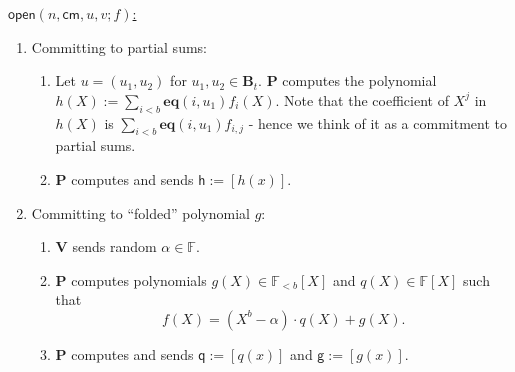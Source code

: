 \documentclass[11pt]{article} %
\newcommand{\F}{\ensuremath{\mathbb F}\xspace}
\newcommand{\cm}{\ensuremath{\mathsf{cm}}\xspace}
\newcommand{\open}{\ensuremath{\mathsf{open}}\xspace}
\newcommand{\defeq}{:=}
\newcommand{\enc}[1]{\ensuremath{\left[#1\right]}\xspace}
\newcommand{\prv}{\ensuremath{\mathsf{\mathbf{P}}}\xspace}
\newcommand{\ver}{\ensuremath{\mathsf{\mathbf{V}}}\xspace}
\newcommand{\polysofdeg}[1]{\ensuremath{\F_{< #1}[X]}\xspace}
\newcommand{\polys}{\ensuremath{\F[X]}\xspace}
\newcommand{\sumi}[1]{\sum_{i< #1}}
\newcommand{\h}{\ensuremath{\mathsf{h}}\xspace}
\renewcommand{\g}{\ensuremath{\mathsf{g}}\xspace}
\newcommand{\q}{\ensuremath{\mathsf{q}}\xspace}
\newcommand{\eq}{\ensuremath{\mathsf{eq}}\xspace}
\renewcommand{\eq}{\ensuremath{\mathbf{eq}}\xspace}
\newcommand{\B}[1]{\ensuremath{\mathbf{B}_{#1}}\xspace}
\begin{document}
\noindent
\underline{$\open(n,\cm,u,v;f)$:} \\ \noindent
\begin{enumerate}
 \item \textsf{Committing to partial sums:} \ 
\begin{enumerate}
\item Let $u=(u_1,u_2)$ for $u_1,u_2 \in \B{t}$. \prv computes the polynomial $h(X)\defeq \sumi{b}\eq(i,u_1) f_i(X)$. Note that the coefficient of $X^j$ in $h(X)$ is $\sumi{b}\eq(i,u_1) f_{i,j}$ - hence we think of it as a commitment to partial sums. 
 \item \prv computes and sends $\h\defeq\enc{h(x)}$.
 
 \end{enumerate}
\item \textsf{ Committing to  ``folded'' polynomial $g$:} 
\begin{enumerate}
 \item \ver sends random $\alpha \in \F$.
\item \prv computes polynomials $g(X) \in \polysofdeg{b}$ and $q(X)\in \polys$ such that
\[f(X)=(X^b-\alpha)\cdot q(X) + g(X).\]\label{step:modalpha}
\item \prv computes and sends $\q\defeq \enc{q(x)}$ and $\g\defeq \enc{g(x)}$.

\end{enumerate}


\end{enumerate}
\end{document}
